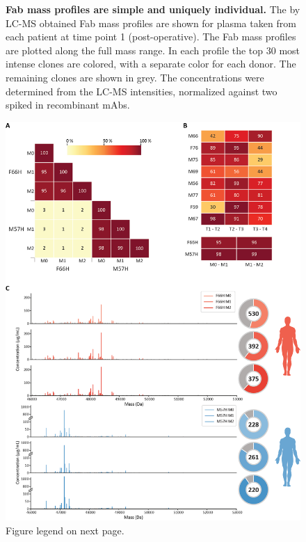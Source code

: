 \begin{subappendices}
\begin{figure}[!hbt]
    \caption{
      \textbf{Fab mass profiles are simple and uniquely individual.} The by LC-MS obtained Fab mass profiles are shown for plasma taken from each patient at time point 1 (post-operative). The Fab mass profiles are plotted along the full mass range. In each profile the top 30 most intense clones are colored, with a separate color for each donor. The remaining clones are shown in grey. The concentrations were determined from the LC-MS intensities, normalized against two spiked in recombinant mAbs.
    }
    \label{fig:figs3.3}
  \end{figure}

  \vspace{1cm}

  \begin{figure}[!p]
    \center
    \includegraphics[]{Chapter.3/Figures/fs4.png}
    \captionsetup{singlelinecheck = false, format= hang}
    \caption{
      Figure legend on next page.
    }
    \label{fig:figs3.4}

\end{figure}
\end{subappendices}
